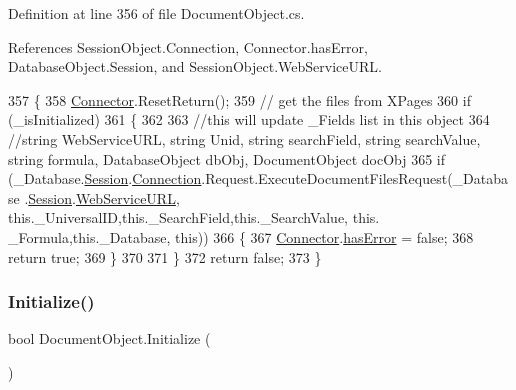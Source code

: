 Definition at line 356 of file Document\+Object.\+cs.



References Session\+Object.\+Connection, Connector.\+has\+Error, Database\+Object.\+Session, and Session\+Object.\+Web\+Service\+U\+RL.


\begin{DoxyCode}
357     \{
358         \mbox{\hyperlink{class_connector}{Connector}}.ResetReturn();
359         \textcolor{comment}{// get the files from XPages}
360         \textcolor{keywordflow}{if} (\_isInitialized)
361         \{
362 
363             \textcolor{comment}{//this will update \_Fields list in this object}
364             \textcolor{comment}{//string WebServiceURL, string Unid, string searchField, string searchValue, string formula,
       DatabaseObject dbObj, DocumentObject docObj}
365             \textcolor{keywordflow}{if} (\_Database.\mbox{\hyperlink{class_database_object_aa8484162b7d2a7c4c9426bca13c64c07}{Session}}.\mbox{\hyperlink{class_session_object_a014bdbf705a753540e19bfb53030c55c}{Connection}}.Request.ExecuteDocumentFilesRequest(\_Database
      .\mbox{\hyperlink{class_database_object_aa8484162b7d2a7c4c9426bca13c64c07}{Session}}.\mbox{\hyperlink{class_session_object_a697c071c812fbf7ad1166b896fb44c16}{WebServiceURL}}, \textcolor{keyword}{this}.\_UniversalID,\textcolor{keyword}{this}.\_SearchField,\textcolor{keyword}{this}.\_SearchValue, \textcolor{keyword}{this}.
      \_Formula,\textcolor{keyword}{this}.\_Database, \textcolor{keyword}{this}))
366             \{
367                 \mbox{\hyperlink{class_connector}{Connector}}.\mbox{\hyperlink{class_connector_a079bae21a5417efa53bfe8954c0f533f}{hasError}} = \textcolor{keyword}{false};
368                 \textcolor{keywordflow}{return} \textcolor{keyword}{true};
369             \}
370 
371         \}
372         \textcolor{keywordflow}{return} \textcolor{keyword}{false};
373     \}
\end{DoxyCode}
\mbox{\label{class_document_object_af4298d6cfbb9ea60643d9995309b73f1}} 
\subsubsection{\texorpdfstring{Initialize()}{Initialize()}}
{\footnotesize\ttfamily bool Document\+Object.\+Initialize (\begin{DoxyParamCaption}{ }\end{DoxyParamCaption})}



